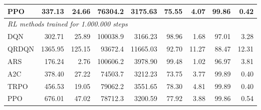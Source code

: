 \begin{samepage}
\begin{center}
\begin{tabular}{l|rr|rr|rr|rr}
    PPO          &   337.13 &    24.66 &    76304.2 &    3175.63 &   75.55 &    4.07 &   99.86 &    0.42 \\
    \midrule
    \multicolumn{9}{l}{\textit{RL methods trained for 1.000.000 steps}} \\
    \midrule
    DQN          &   302.71 &    25.89 &   100038.9 &    3166.23 &   98.96 &    1.68 &   97.01 &    3.28 \\
    QRDQN        &  1365.95 &   125.15 &    93672.4 &   11665.03 &   92.70 &   11.27 &   88.47 &   12.31 \\
    ARS          &   176.24 &     2.76 &   100606.2 &    3978.90 &   99.48 &    1.02 &   96.97 &    3.81 \\
    A2C          &   378.40 &    27.22 &    74503.7 &    3212.23 &   73.75 &    3.77 &   99.89 &    0.40 \\
    TRPO         &   456.53 &    19.05 &    79062.2 &    3551.65 &   78.30 &    4.81 &   99.89 &    0.40 \\
    PPO          &   676.01 &    47.02 &    78712.3 &    3200.59 &   77.92 &    3.88 &   99.86 &    0.54 \\
    \bottomrule
  \end{tabular}
\end{center}
\end{samepage}

